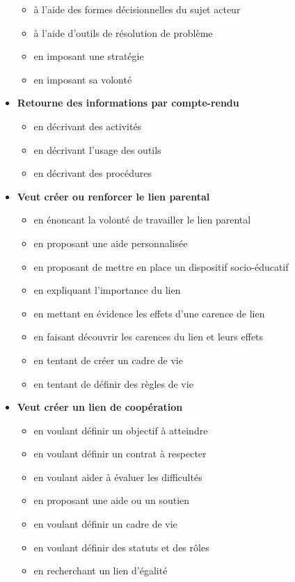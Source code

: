 \documentclass[8pt,a4paper]{article}
\begin{document}
\begin{itemize}
\begin{itemize}
\item à l'aide des formes décisionnelles du sujet acteur
\item à l'aide d'outils de résolution de problème
\item en imposant une stratégie
\item en imposant sa volonté
\\ 
 \end{itemize}
\item \textbf{Retourne des informations par compte-rendu}
\begin{itemize}
\item en décrivant des activités
\item en décrivant l'usage des outils
\item en décrivant des procédures
\\ 
 \end{itemize}
\item \textbf{Veut créer ou renforcer le lien parental}
\begin{itemize}
\item en énoncant la volonté de travailler le lien parental
\item en proposant une aide personnalisée
\item en proposant de mettre en place un dispositif socio-éducatif
\item en expliquant l'importance du lien
\item en mettant en évidence les effets d'une carence de lien
\item en faisant découvrir les carences du lien et leurs effets
\item en tentant de créer un cadre de vie
\item en tentant de définir des règles de vie
\\ 
 \end{itemize}
\item \textbf{Veut créer un lien de coopération}
\begin{itemize}
\item en voulant définir un objectif à atteindre 
\item en voulant définir un contrat à respecter 
\item en voulant aider à évaluer les difficultés  
\item en proposant une aide ou un soutien   
\item en voulant définir un cadre de vie  
\item en voulant définir des statuts et des rôles  
\item en recherchant un lien d'égalité

\end{itemize}
\end{itemize}
\end{document}
